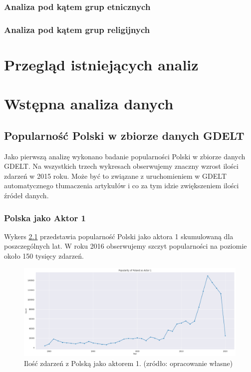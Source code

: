 \documentclass[11pt]{report}
\begin{document}
 \subsection{Analiza pod kątem grup etnicznych}
 \subsection{Analiza pod kątem grup religijnych}
 
 
 \chapter{Przegląd istniejących analiz}\label{ch:przeglad}
  
 \chapter{Wstępna analiza danych}
 \section{Popularność Polski w zbiorze danych GDELT}
 Jako pierwszą analizę wykonano badanie popularności Polski w zbiorze danych GDELT. Na wszystkich trzech wykresach obserwujemy znaczny wzrost ilości zdarzeń w 2015 roku. Może być to związane z uruchomieniem w GDELT automatycznego tłumaczenia artykułów i co za tym idzie zwiększeniem ilości źródeł danych.
 \subsection{Polska jako Aktor 1}
 Wykers \ref{fig:PLactor1} przedstawia popularność Polski jako aktora 1 skumulowaną dla poszczególnych lat. W roku 2016 obserwujemy szczyt popularności na poziomie około 150 tysięcy zdarzeń.
    \begin{figure}[ht]
	\centering
	\includegraphics[width=0.8 \textwidth]{fig/PL/PLactor1.png}
	\caption{Ilość zdarzeń z Polską jako aktorem 1. (zródło: opracowanie własne)}
		\label{fig:PLactor1}
	\end{figure}
	
\end{document}

